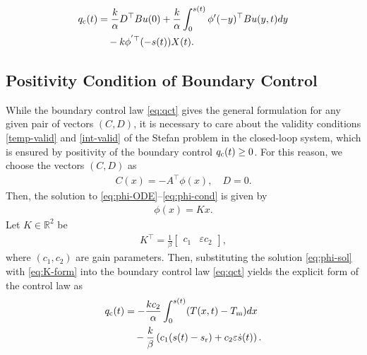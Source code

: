 \documentclass[letterpaper, 10 pt, conference]{cls/ieeeconf}
\theoremstyle{definition}
\newcommand{\ep}{\varepsilon}
\newcommand{\bbR}{\mathbb{R}}
\begin{document}
\begin{align}
    q_{\rm c}(t) & = \frac{k}{\alpha} D^\top B  u(0) + \frac{k}{\alpha}  \int_0^{s(t)} \phi'(- y)^\top B u(y,t) dy \notag\\
    & \quad - k \phi^{'\top} (-s(t)) X(t).  \label{eq:qct}
    \end{align}

\subsection{Positivity Condition of Boundary Control}
While the boundary control law \eqref{eq:qct} gives the general formulation for any given pair of vectors $(C,D)$, it is necessary to care about the validity conditions \eqref{temp-valid} and \eqref{int-valid} of the Stefan problem in the closed-loop system, which is ensured by positivity of the boundary control $q_{\rm c}(t) \geq 0$. For this reason, we choose the vectors $(C,D)$ as 
\begin{align} \label{eq:C-def}
    C(x) = - A^\top \phi(x), \quad D = 0. 
\end{align}
Then, the solution to \eqref{eq:phi-ODE}--\eqref{eq:phi-cond} is given by  
\begin{align} \label{eq:phi-sol}
    \phi(x) = K x. 
\end{align}
Let $K \in \bbR^2$ be 
\begin{align}
    K^\top = \frac{1}{\beta}
    \left[
    \begin{array}{cc}
      c_1   &  \ep c_2 
    \end{array}
    \right],  \label{eq:K-form}
\end{align}
where $(c_1, c_2)$ are gain parameters. Then, substituting the solution \eqref{eq:phi-sol} with \eqref{eq:K-form} into the boundary control law \eqref{eq:qct} yields the explicit form of the control law as 
\begin{align}
    q_{\rm c}(t)
    & = - \frac{ k c_2}{\alpha}  \int_0^{s(t)}  (T(x,t) - T_{\rm m})  dx \notag\\
    & \quad - \frac{k}{\beta} \left (c_1 (s(t) - s_{\rm r}) + c_2\ep  \dot s(t) \right).  \label{eq:qct-exp}
\end{align}
\end{document}
